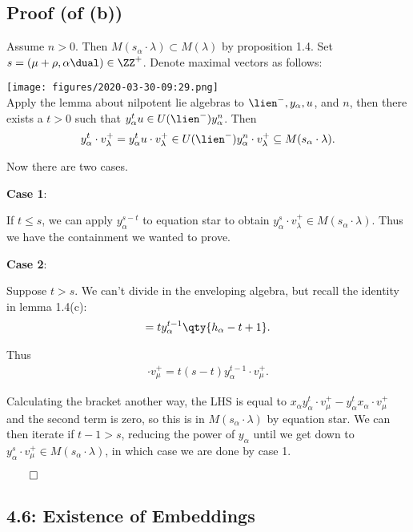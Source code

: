 \hypertarget{proof-of-b}{%
\subsection{Proof (of (b))}\label{proof-of-b}}

Assume \(n>0\). Then \(M(s_\alpha \cdot \lambda) \subset M(\lambda)\) by
proposition 1.4. Set \(s = (\mu + \rho, \alpha\dual) \in \ZZ^+\). Denote
maximal vectors as follows:

\texttt{[image: figures/2020-03-30-09:29.png]}\\

Apply the lemma about nilpotent lie algebras to
\(\lien^-, y_\alpha, u\), and \(n\), then there exists a \(t>0\) such
that \(y_\alpha^t u \in U(\lien^-) y_\alpha^n\). Then
\begin{align*}\label{star}
y_\alpha^t \cdot v_\lambda^+ = y_\alpha^t u \cdot v_\lambda^+ \in U(\lien^-) y_\alpha^n \cdot v_\lambda^+ \subseteq M(s_\alpha \cdot \lambda)
.\end{align*}

Now there are two cases.

\textbf{Case 1}:

If \(t\leq s\), we can apply \(y_\alpha^{s-t}\) to equation star to
obtain \(y_\alpha^s \cdot v_\lambda^+ \in M(s_\alpha \cdot \lambda)\).
Thus we have the containment we wanted to prove.

\textbf{Case 2}:

Suppose \(t > s\). We can't divide in the enveloping algebra, but recall
the identity in lemma 1.4(c): \begin{align*}
[x_\alpha y_\alpha^t] = t y_\alpha^{t-1} \qty{ h_\alpha - t + 1}
.\end{align*}

Thus \begin{align*}
[x_\alpha y_\alpha^t] \cdot v_\mu^+ = t(s-t) y_\alpha^{t-1} \cdot v_\mu^+
.\end{align*}

Calculating the bracket another way, the LHS is equal to
\(x_\alpha y_\alpha^t \cdot v_\mu^+ - y_\alpha^t x_\alpha \cdot v_\mu^+\)
and the second term is zero, so this is in \(M(s_\alpha \cdot \lambda)\)
by equation star. We can then iterate if \(t-1 > s\), reducing the power
of \(y_\alpha\) until we get down to
\(y_\alpha^s \cdot v_\mu^+ \in M(s_\alpha \cdot \lambda)\), in which
case we are done by case 1.

\(\qed\)

\hypertarget{existence-of-embeddings}{%
\subsection{4.6: Existence of
Embeddings}\label{existence-of-embeddings}}

